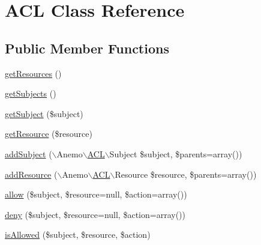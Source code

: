 \hypertarget{class_anemo_1_1_a_c_l}{
\section{ACL Class Reference}
\label{class_anemo_1_1_a_c_l}
}
\subsection*{Public Member Functions}
\begin{DoxyCompactItemize}
\item 
\hyperlink{class_anemo_1_1_a_c_l_acfe6846338dbf5cf990a593d55cbdc4c}{getResources} ()
\item 
\hyperlink{class_anemo_1_1_a_c_l_af976af67c94935c7d509d444522c5657}{getSubjects} ()
\item 
\hyperlink{class_anemo_1_1_a_c_l_a756687b01e7b913c06b90f5dc7ccac06}{getSubject} (\$subject)
\item 
\hyperlink{class_anemo_1_1_a_c_l_aa2c1b8634bea77c8eb6a7d909511bd52}{getResource} (\$resource)
\item 
\hyperlink{class_anemo_1_1_a_c_l_a9c9043ddd329ac25a0cb42486f5f1c2e}{addSubject} ($\backslash$Anemo$\backslash$\hyperlink{class_anemo_1_1_a_c_l}{ACL}$\backslash$Subject \$subject, \$parents=array())
\item 
\hyperlink{class_anemo_1_1_a_c_l_ae76173d288dd82e68ed722cf412b8d5c}{addResource} ($\backslash$Anemo$\backslash$\hyperlink{class_anemo_1_1_a_c_l}{ACL}$\backslash$Resource \$resource, \$parents=array())
\item 
\hyperlink{class_anemo_1_1_a_c_l_a07bc8d3c0e088693858b0535f150d136}{allow} (\$subject, \$resource=null, \$action=array())
\item 
\hyperlink{class_anemo_1_1_a_c_l_acb2fb7d69d163b8f13c99492b402e471}{deny} (\$subject, \$resource=null, \$action=array())
\item 
\hyperlink{class_anemo_1_1_a_c_l_a7dd7085d9ca64b04d068f3982d86c4b2}{isAllowed} (\$subject, \$resource, \$action)
\end{DoxyCompactItemize}
